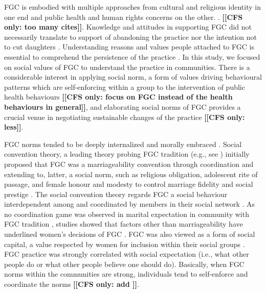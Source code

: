 \documentclass[12pt,]{article}
\newcommand{\comment}[1]{\textbf{[[#1]]}}
\newcommand{\cfonly}[1]{\comment{CFS only: #1}}
\begin{document}
FGC is embodied with multiple approaches from cultural and religious identity in one end and public health and human rights concerns on the other. \cite{AhmeKare18, BergDeni13a, Boyl02, BoylMcMo02, Grue01, KhosBane17, KimaShell18, McCh15, SchuLien13, WHO12}. \cfonly{too many cites}.  Knowledge and attitudes in supporting FGC did not necessarily translate to support of abandoning the practice nor the intention not to cut daughters \cite{ChegAske04}.  Understanding reasons and values people attached to FGC is essential to comprehend the persistence of the practice \cite{Bicc10, Cami15, CislHeis18, Mack96}.  In this study, we focused on social values of FGC to understand the practice in communities.  There is a considerable interest in applying social norm, a form of values driving behavioural patterns which are self-enforcing within a group \cite{Youn15} to the intervention of public health behaviours \cite{Ajze91, Ajze02, CislHeis18a, MillPrin16, MollRima10, RimaLapi15} \cfonly{focus on FGC instead of the health behaviours in general}, and elaborating social norms of FGC provides a crucial venue in negotiating sustainable changes of the practice \cite{Bicc10, BiccMari15, BoylCorl010, DuncWand11, Drol11, EffeVogt15, Hayf05, HayfTrin11, Grue05, Hodg11,KandNwak09, Mack96, Mack00, MackLeJe08, OdukAfol17, RimaLapi15, Youn02, Youn11, UNIC10, UNIC13} \cfonly{less}. 

FGC norms tended to be deeply internalized and morally embraced \cite{SchuLien13}.  Social convention theory, a leading theory probing FGC tradition (e.g., see \cite{BoylMcMo02, BoylCorl10, FreyJohn07, FrieMahm13, Hayf05, KandMwek09, Mack96, Mack06, ReigGonz14, YirgKass12}) initially proposed that FGC was a marriageability convention through coordination \cite{Mack96} and extending to, latter, a social norm, such as religious obligation, adolescent rite of passage, and female honour and modesty to control marriage fidelity and social prestige \cite{Mack00, MackLeJe08}.   The social convention theory regards FGC a social behaviour interdependent among and coordinated by members in their social network \cite{Mack00, MackLeJe08, ShelWand11}.  As no coordination game was observed in marital expectation in community with FGC tradition \cite{EffeVogt15}, studies showed that factors other than marriageability have underlined women’s  decisions of FGC \cite{AlcaGonz13, BellNova15, EffeVogt15, Hayf05, Mack09, PashPonn16, Rima08, ShelWand11, more?}.  FGC was also viewed as a form of social capital, a value respected by women for inclusion within their social groups \cite{ShelWand11}.    FGC practice was strongly correlated with social expectation (i.e., what other people do or what other people believe one should do)\cite{BiccMari15}.   Basically, when FGC norms within the communities are strong, individuals tend to self-enforce and coordinate the norms \cite{Ajze02, Hayf05, KandNwak09, KandShel19, Mack96, Mack06, MackLeJe08, ThomMadd92} \cfonly{add \cite{Bicc15}}.
\end{document}
